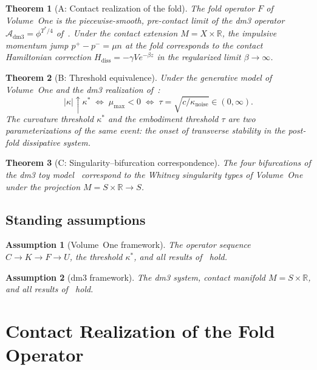 \documentclass[12pt]{article}
\numberwithin{equation}{section}
\newtheorem{theorem}{Theorem}[section]
\newtheorem{assumption}{Assumption}[section]
\theoremstyle{remark}
\newcommand{\R}{\mathbb{R}}
\begin{document}
\begin{theorem}[A: Contact realization of the fold]
\label{thm:A}
The fold operator $F$ of Volume~One is the piecewise-smooth,
pre-contact limit of the dm3 operator
$\mathcal{A}_{\mathrm{dm3}} = \phi^{T^*/4}$ of~\cite{Paper1}.
Under the contact extension $M = X\times\R$, the impulsive
momentum jump $p^+ - p^- = \mu n$ at the fold corresponds to
the contact Hamiltonian correction
$H_{\mathrm{diss}} = -\gamma V e^{-\beta z}$
in the regularized limit $\beta\to\infty$.
\end{theorem}

\begin{theorem}[B: Threshold equivalence]
\label{thm:B}
Under the generative model of Volume~One and the dm3
realization of~\cite{Paper1}:
\[
  |\kappa|\uparrow\kappa^*
  \;\iff\;
  \mu_{\max} < 0
  \;\iff\;
  \tau = \sqrt{c/\kappa_{\mathrm{noise}}} \in (0,\infty).
\]
The curvature threshold $\kappa^*$ and the embodiment threshold
$\tau$ are two parameterizations of the same event: the onset of
transverse stability in the post-fold dissipative system.
\end{theorem}

\begin{theorem}[C: Singularity--bifurcation correspondence]
\label{thm:C}
The four bifurcations of the dm3 toy model~\cite{Paper2}
correspond to the Whitney singularity types of Volume~One
under the projection $M = S\times\R\to S$.
\end{theorem}

\subsection{Standing assumptions}

\begin{assumption}[Volume~One framework]
The operator sequence $C\to K\to F\to U$, the threshold $\kappa^*$,
and all results of~\cite{PO1} hold.
\end{assumption}

\begin{assumption}[dm3 framework]
The dm3 system, contact manifold $M=S\times\R$, and all results
of~\cite{Paper1,Paper2} hold.
\end{assumption}

\section{Contact Realization of the Fold Operator}
\label{sec:contact-fold}
\end{document}
